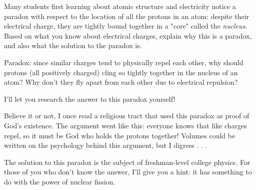 

Many students first learning about atomic structure and electricity notice a paradox with respect to the location of all the protons in an atom: despite their electrical charge, they are tightly bound together in a "core" called the {\it nucleus}.  Based on what you know about electrical charges, explain why this is a paradox, and also what the solution to the paradox is.







Paradox: since similar charges tend to physically repel each other, why should protons (all positively charged) cling so tightly together in the nucleus of an atom?  Why don't they fly apart from each other due to electrical repulsion?

I'll let you research the answer to this paradox yourself!







Believe it or not, I once read a religious tract that used this paradox as proof of God's existence.  The argument went like this: everyone knows that like charges repel, so it must be God who holds the protons together!  Volumes could be written on the psychology behind this argument, but I digress . . .

The solution to this paradox is the subject of freshman-level college physics.  For those of you who don't know the answer, I'll give you a hint: it has something to do with the power of nuclear fission.




